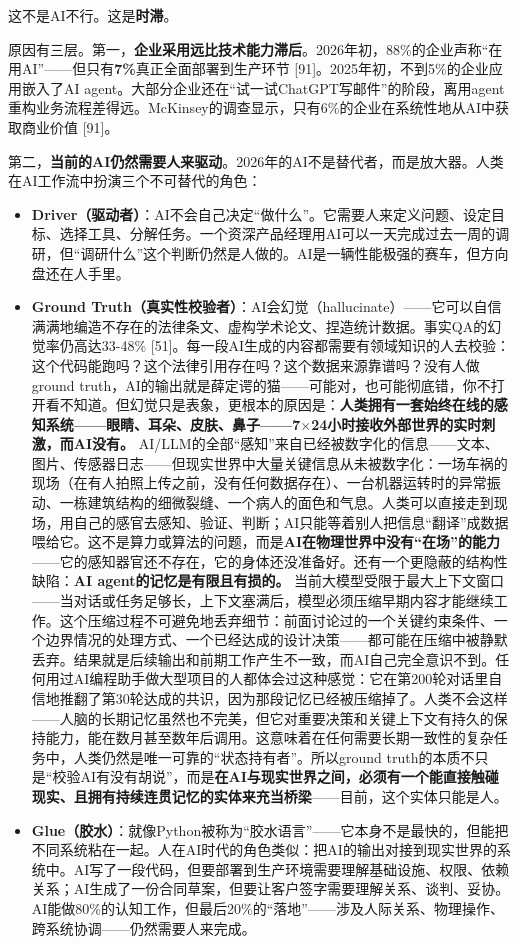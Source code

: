 \documentclass[11pt,a4paper]{ctexart}
\begin{document}
这不是AI不行。这是\textbf{时滞}。

原因有三层。第一，\textbf{企业采用远比技术能力滞后}。2026年初，88\%的企业声称“在用AI”——但只有\textbf{7\%}真正全面部署到生产环节 [91]。2025年初，不到5\%的企业应用嵌入了AI agent。大部分企业还在“试一试ChatGPT写邮件”的阶段，离用agent重构业务流程差得远。McKinsey的调查显示，只有6\%的企业在系统性地从AI中获取商业价值 [91]。

第二，\textbf{当前的AI仍然需要人来驱动}。2026年的AI不是替代者，而是放大器。人类在AI工作流中扮演三个不可替代的角色：

\begin{itemize}
  \item \textbf{Driver（驱动者）}：AI不会自己决定“做什么”。它需要人来定义问题、设定目标、选择工具、分解任务。一个资深产品经理用AI可以一天完成过去一周的调研，但“调研什么”这个判断仍然是人做的。AI是一辆性能极强的赛车，但方向盘还在人手里。
  \item \textbf{Ground Truth（真实性校验者）}：AI会幻觉（hallucinate）——它可以自信满满地编造不存在的法律条文、虚构学术论文、捏造统计数据。事实QA的幻觉率仍高达33-48\% [51]。每一段AI生成的内容都需要有领域知识的人去校验：这个代码能跑吗？这个法律引用存在吗？这个数据来源靠谱吗？没有人做ground truth，AI的输出就是薛定谔的猫——可能对，也可能彻底错，你不打开看不知道。但幻觉只是表象，更根本的原因是：\textbf{人类拥有一套始终在线的感知系统——眼睛、耳朵、皮肤、鼻子——7$\times$24小时接收外部世界的实时刺激，而AI没有。} AI/LLM的全部“感知”来自已经被数字化的信息——文本、图片、传感器日志——但现实世界中大量关键信息从未被数字化：一场车祸的现场（在有人拍照上传之前，没有任何数据存在）、一台机器运转时的异常振动、一栋建筑结构的细微裂缝、一个病人的面色和气息。人类可以直接走到现场，用自己的感官去感知、验证、判断；AI只能等着别人把信息“翻译”成数据喂给它。这不是算力或算法的问题，而是\textbf{AI在物理世界中没有“在场”的能力}——它的感知器官还不存在，它的身体还没准备好。还有一个更隐蔽的结构性缺陷：\textbf{AI agent的记忆是有限且有损的。} 当前大模型受限于最大上下文窗口——当对话或任务足够长，上下文塞满后，模型必须压缩早期内容才能继续工作。这个压缩过程不可避免地丢弃细节：前面讨论过的一个关键约束条件、一个边界情况的处理方式、一个已经达成的设计决策——都可能在压缩中被静默丢弃。结果就是后续输出和前期工作产生不一致，而AI自己完全意识不到。任何用过AI编程助手做大型项目的人都体会过这种感觉：它在第200轮对话里自信地推翻了第30轮达成的共识，因为那段记忆已经被压缩掉了。人类不会这样——人脑的长期记忆虽然也不完美，但它对重要决策和关键上下文有持久的保持能力，能在数月甚至数年后调用。这意味着在任何需要长期一致性的复杂任务中，人类仍然是唯一可靠的“状态持有者”。所以ground truth的本质不只是“校验AI有没有胡说”，而是\textbf{在AI与现实世界之间，必须有一个能直接触碰现实、且拥有持续连贯记忆的实体来充当桥梁}——目前，这个实体只能是人。
  \item \textbf{Glue（胶水）}：就像Python被称为“胶水语言”——它本身不是最快的，但能把不同系统粘在一起。人在AI时代的角色类似：把AI的输出对接到现实世界的系统中。AI写了一段代码，但要部署到生产环境需要理解基础设施、权限、依赖关系；AI生成了一份合同草案，但要让客户签字需要理解关系、谈判、妥协。AI能做80\%的认知工作，但最后20\%的“落地”——涉及人际关系、物理操作、跨系统协调——仍然需要人来完成。
\end{itemize}
\end{document}
